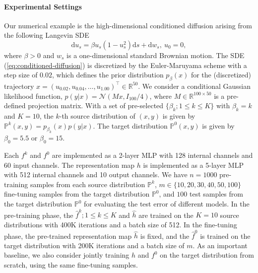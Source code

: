 \documentclass[11pt]{article}
\numberwithin{equation}{section}
\renewcommand{\eqref}[1]{(\ref{#1})}
\begin{document}
\paragraph{Experimental Settings}
Our numerical example is the high-dimensional conditioned diffusion \citep{cui2016dimension, yu2023hierarchical} arising from the following Langevin SDE
\begin{equation}\label{eq:conditioned-diffusion}
\mathrm{d} u_s = \beta u_s(1-u_s^2) \mathrm{d} s + \mathrm{d} w_s, \ u_0=0,
\end{equation}
where $\beta >0$ and $w_s$ is a one-dimensional standard Brownian motion.
The SDE \eqref{eq:conditioned-diffusion} is discretized by the Euler-Maruyama scheme with a step size of $0.02$, which defines the prior distribution $p_{\beta}(x)$ for the (discretized) trajectory $x=\left(u_{0.02}, u_{0.04}, \ldots, u_{1.00}\right)^\top\in \mathbb{R}^{50}$.
We consider a conditional Gaussian likelihood function, $p(y|x)=\mathcal{N}(Mx, I_{100}/4)$, where $M\in \mathbb{R}^{100\times 50}$ is a pre-defined projection matrix.
With a set of pre-selected $\{\beta_k; 1\leq k\leq K\}$ with $\beta_k=k$ and $K=10$, the $k$-th source distribution of $(x,y)$ is given by $\mathbb{P}^k(x,y)=p_{\beta_k}(x)p(y|x)$.
The target distribution $\mathbb{P}^0(x,y)$ is given by $\beta_0=5.5$ or $\beta_0=15$.

Each $f^k$ and $f^0$ are implemented as a 2-layer MLP with 128 internal channels and 60 input channels. The representation map $h$ is implemented as a 5-layer MLP with 512 internal channels and 10 output channels.
We have $n=1000$ pre-training samples from each source distribution $\mathbb{P}^k$, $m\in\{10,20,30, 40,50,100\}$ fine-tuning samples from the target distribution $\mathbb{P}^0$, and $100$ test samples from the target distribution $\mathbb{P}^0$ for evaluating the test error of different models.
In the pre-training phase, the ${\widehat{f}^k; 1\leq k\leq K}$ and $\hat{h}$ are trained on the $K=10$ source distributions with 400K iterations and a batch size of 512.
In the fine-tuning phase, the pre-trained representation map $\widehat{h}$ is fixed, and the $\widehat{f}^0$ is trained on the target distribution with 200K iterations and a batch size of $m$.
As an important baseline, we also consider jointly training $h$ and $f^{0}$ on the target distribution from scratch, using the same fine-tuning samples.
\end{document}
